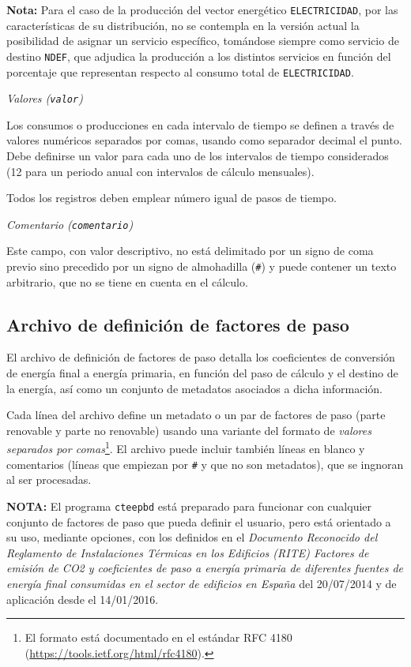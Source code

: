 \documentclass[10pt,notitlepage,oneside,a4paper]{article}
\begin{document}
\textbf{Nota:} Para el caso de la producción del vector energético \texttt{ELECTRICIDAD}, por las características de su distribución, no se contempla en la versión actual la posibilidad de asignar un servicio específico, tomándose siempre como servicio de destino \texttt{NDEF}, que adjudica la producción a los distintos servicios en función del porcentaje que representan respecto al consumo total de \texttt{ELECTRICIDAD}.

\textit{Valores (\texttt{valor})}

Los consumos o producciones en cada intervalo de tiempo se definen a través de valores numéricos separados por comas, usando como separador decimal el punto. Debe definirse un valor para cada uno de los intervalos de tiempo considerados (12 para un periodo anual con intervalos de cálculo mensuales).

Todos los registros deben emplear número igual de pasos de tiempo.

\textit{Comentario (\texttt{comentario})}

Este campo, con valor descriptivo, no está delimitado por un signo de coma previo sino precedido por un signo de almohadilla (\texttt{\#}) y puede contener un texto arbitrario, que no se tiene en cuenta en el cálculo.

\clearpage
\newpage
\subsection{Archivo de definición de factores de paso}\label{sec:formatofactorespaso}

El archivo de definición de factores de paso detalla los coeficientes de conversión de energía final a energía primaria, en función del paso de cálculo y el destino de la energía, así como un conjunto de metadatos asociados a dicha información.

Cada línea del archivo define un metadato o un par de factores de paso (parte renovable y parte no renovable) usando una variante del formato de \textit{valores separados por comas}\footnote{El formato está documentado en el estándar RFC 4180 (\url{https://tools.ietf.org/html/rfc4180}).}. El archivo puede incluir también líneas en blanco y comentarios (líneas que empiezan por \texttt{\#} y que no son metadatos), que se ingnoran al ser procesadas.

\begin{myquote}\small
\textbf{NOTA:} El programa \texttt{cteepbd} está preparado para funcionar con cualquier conjunto de factores de paso que pueda definir el usuario, pero está orientado a su uso, mediante opciones, con los definidos en el \textit{Documento Reconocido del Reglamento de Instalaciones Térmicas en los Edificios (RITE) Factores de emisión de CO2 y coeficientes de paso a energía primaria de diferentes fuentes de energía final consumidas en el sector de edificios en España} del 20/07/2014 y de aplicación desde el 14/01/2016.
\end{myquote}
\end{document}
